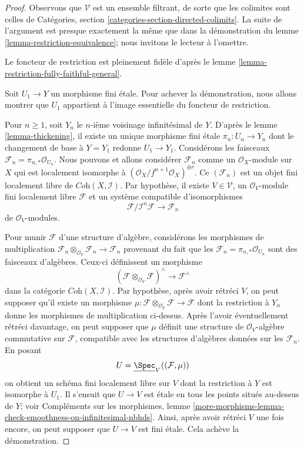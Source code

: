\begin{proof}
Observons que $\mathcal{V}$ est un ensemble filtrant, de sorte que les colimites sont
celles de Catégories, section \ref{categories-section-directed-colimits}.
La suite de l'argument est presque exactement la même que dans la démonstration
du lemme \ref{lemma-restriction-equivalence}; nous invitons le lecteur
à l'omettre.

\medskip\noindent
Le foncteur de restriction est pleinement fidèle d'après le
lemme \ref{lemma-restriction-fully-faithful-general}.

\medskip\noindent
Soit $U_1 \to Y$ un morphisme fini étale. Pour achever la démonstration,
nous allons montrer que $U_1$ appartient à l'image essentielle du
foncteur de restriction.

\medskip\noindent
Pour $n \geq 1$, soit $Y_n$ le $n$-ième voisinage infinitésimal de $Y$.
D'après le lemme \ref{lemma-thickening},
il existe un unique morphisme fini étale
$\pi_n : U_n \to Y_n$ dont le changement de base à $Y = Y_1$
redonne $U_1 \to Y_1$.
Considérons les faisceaux $\mathcal{F}_n = \pi_{n, *}\mathcal{O}_{U_n}$.
Nous pouvons et allons considérer $\mathcal{F}_n$ comme un $\mathcal{O}_X$-module sur $X$
qui est localement isomorphe à
$(\mathcal{O}_X/f^{n + 1}\mathcal{O}_X)^{\oplus r}$.
Ce $(\mathcal{F}_n)$ est un objet fini localement libre de
$\textit{Coh}(X, \mathcal{I})$.
Par hypothèse, il existe $V \in \mathcal{V}$,
un $\mathcal{O}_V$-module fini localement libre $\mathcal{F}$
et un système compatible d'isomorphismes
$$
\mathcal{F}/\mathcal{I}^n\mathcal{F} \to \mathcal{F}_n
$$
de $\mathcal{O}_V$-modules.

\medskip\noindent
Pour munir $\mathcal{F}$ d'une structure d'algèbre, considérons les
morphismes de multiplication
$\mathcal{F}_n \otimes_{\mathcal{O}_V} \mathcal{F}_n \to \mathcal{F}_n$
provenant du fait que les $\mathcal{F}_n = \pi_{n, *}\mathcal{O}_{U_n}$
sont des faisceaux d'algèbres. Ceux-ci définissent un morphisme
$$
(\mathcal{F}\otimes_{\mathcal{O}_V} \mathcal{F})^\wedge
\longrightarrow
\mathcal{F}^\wedge
$$
dans la catégorie $\textit{Coh}(X, \mathcal{I})$. Par hypothèse,
après avoir rétréci $V$, on peut supposer qu'il existe un morphisme
$\mu : \mathcal{F}\otimes_{\mathcal{O}_V} \mathcal{F} \to \mathcal{F}$
dont la restriction à $Y_n$ donne les morphismes de multiplication ci-dessus.
Après l'avoir éventuellement rétréci davantage, on peut supposer que $\mu$
définit une structure de $\mathcal{O}_V$-algèbre commutative
sur $\mathcal{F}$, compatible avec les structures d'algèbres données
sur les $\mathcal{F}_n$.
En posant
$$
U = \underline{\Spec}_V((\mathcal{F}, \mu))
$$
on obtient un schéma fini localement libre sur $V$ dont la restriction
à $Y$ est isomorphe à $U_1$. Il s'ensuit que $U \to V$
est étale en tous les points situés au-dessus de $Y$; voir
Compléments sur les morphismes, lemme
\ref{more-morphisms-lemma-check-smoothness-on-infinitesimal-nbhds}.
Ainsi, après avoir rétréci $V$ une fois encore, on peut supposer que $U \to V$ est
fini étale. Cela achève la démonstration.
\end{proof}

